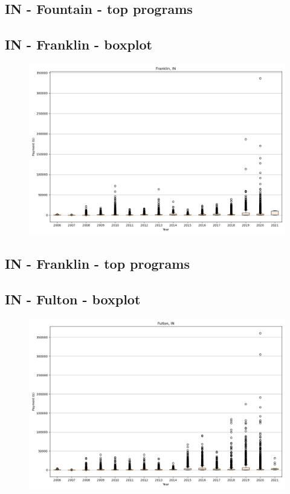 \subsection*{IN - Fountain - top programs}

\newpage
\subsection*{IN - Franklin - boxplot}
\begin{figure}[h]
\centering
\includegraphics[width=7in]{../output/boxplots/counties/Franklin-IN_boxplot.png}
\end{figure}


\subsection*{IN - Franklin - top programs}

\newpage
\subsection*{IN - Fulton - boxplot}
\begin{figure}[h]
\centering
\includegraphics[width=7in]{../output/boxplots/counties/Fulton-IN_boxplot.png}
\end{figure}


